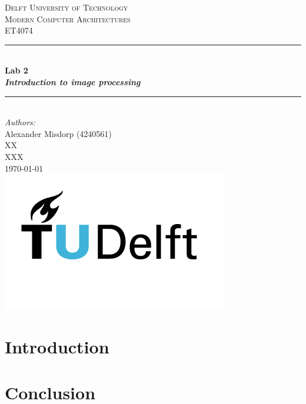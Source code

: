 \documentclass{article}
\begin{document}
\begin{titlepage}

\newcommand{\HRule}{\rule{\linewidth}{0.5mm}}
\newcommand{\tab}[1]{\hspace{.2\textwidth}\rlap{#1}}
\center

\textsc{\LARGE Delft University of Technology}\\[1.5cm]
\textsc{\large Modern Computer Architectures}\\[0.5cm] 
\textsc{\large ET4074}\\[0.5cm]

\HRule \\[0.5cm]
{ \huge \bfseries Lab 2}\\[0.4cm]
{ \Large \itshape \bfseries Introduction to image
processing} \\ [0.3cm]
\HRule \\[1.5cm]

\Large \emph{Authors:}\\
Alexander Misdorp (4240561) \\
XX\\
XXX\\[2.8cm]

{\large \today}\\[2cm]

\includegraphics[scale=0.27]{images/TU_Delft_logo_RGB.png}\\%

\vfill %

\end{titlepage}

\section{Introduction}

\newpage







\newpage

\section{Conclusion}
%
%
\end{document}
